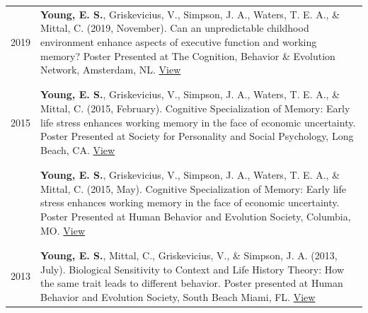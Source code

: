 \documentclass[
]{article}
\begin{document}
\begin{longtable}{p{2.25cm}p{5.5in}}
 2019 &\hangindent=0.25cm \textbf{Young, E. S.}, Griskevicius, V., Simpson, J. A., Waters, T. E. A., \& Mittal, C. (2019, November). Can an unpredictable childhood environment enhance aspects of executive function and working memory? Poster Presented at The Cognition, Behavior \& Evolution Network, Amsterdam, NL. \newline \href{https://www.ethan-young.com/cv/2019_CBEN_poster.pdf}{\textcolor{downloadcolor}{\faFilePdfO{} View}} \\ \\& \\[-1.5em]
 2015 &\hangindent=0.25cm \textbf{Young, E. S.}, Griskevicius, V., Simpson, J. A., Waters, T. E. A., \& Mittal, C. (2015, February). Cognitive Specialization of Memory: Early life stress enhances working memory in the face of economic uncertainty. Poster Presented at Society for Personality and Social Psychology, Long Beach, CA. \newline \href{https://www.ethan-young.com/cv/conference/2015_SPSP_poster.pdf}{\textcolor{downloadcolor}{\faFilePdfO{} View}} \\ \\& \\[-1.5em]
  &\hangindent=0.25cm \textbf{Young, E. S.}, Griskevicius, V., Simpson, J. A., Waters, T. E. A., \& Mittal, C. (2015, May). Cognitive Specialization of Memory: Early life stress enhances working memory in the face of economic uncertainty. Poster Presented at Human Behavior and Evolution Society, Columbia, MO. \newline \href{https://www.ethan-young.com/cv/conference/2015_HBES_poster.pdf}{\textcolor{downloadcolor}{\faFilePdfO{} View}} \\ \\& \\[-1.5em]
 2013 &\hangindent=0.25cm \textbf{Young, E. S.}, Mittal, C., Griskevicius, V., \& Simpson, J. A. (2013, July). Biological Sensitivity to Context and Life History Theory: How the same trait leads to different behavior. Poster presented at Human Behavior and Evolution Society, South Beach Miami, FL. \newline \href{https://www.ethan-young.com/cv/conference/2013_HBES_poster.pdf}{\textcolor{downloadcolor}{\faFilePdfO{} View}} \\ 
\end{longtable}

\vspace{1ex}
\end{document}
